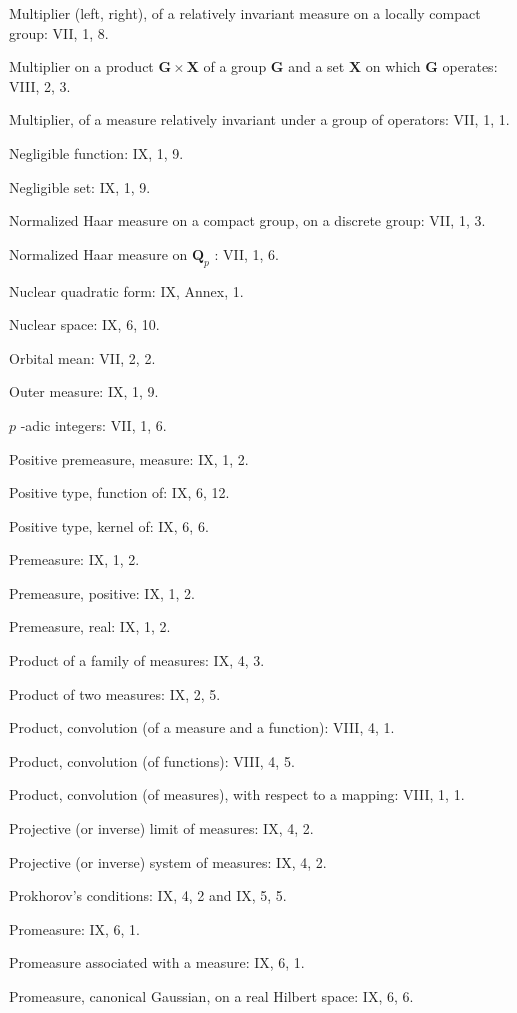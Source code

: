 Multiplier (left, right), of a relatively invariant measure on a locally compact group: VII, 1, 8.

Multiplier on a product \(\mathbf{G} \times \mathbf{X}\) of a group \(\mathbf{G}\) and a set \(\mathbf{X}\) on which \(\mathbf{G}\) operates: VIII, 2, 3.

Multiplier, of a measure relatively invariant under a group of operators: VII, 1, 1.

Negligible function: IX, 1, 9.

Negligible set: IX, 1, 9.

Normalized Haar measure on a compact group, on a discrete group: VII, 1, 3.

Normalized Haar measure on \(\mathbf{Q}_p\) : VII, 1, 6.

Nuclear quadratic form: IX, Annex, 1.

Nuclear space: IX, 6, 10.

Orbital mean: VII, 2, 2.

Outer measure: IX, 1, 9.

\(p\) -adic integers: VII, 1, 6.

Positive premeasure, measure: IX, 1, 2.

Positive type, function of: IX, 6, 12.

Positive type, kernel of: IX, 6, 6.

Premeasure: IX, 1, 2.

Premeasure, positive: IX, 1, 2.

Premeasure, real: IX, 1, 2.

Product of a family of measures: IX, 4, 3.

Product of two measures: IX, 2, 5.

Product, convolution (of a measure and a function): VIII, 4, 1.

Product, convolution (of functions): VIII, 4, 5.

Product, convolution (of measures), with respect to a mapping: VIII, 1, 1.

Projective (or inverse) limit of measures: IX, 4, 2.

Projective (or inverse) system of measures: IX, 4, 2.

Prokhorov's conditions: IX, 4, 2 and IX, 5, 5.

Promeasure: IX, 6, 1.

Promeasure associated with a measure: IX, 6, 1.

Promeasure, canonical Gaussian, on a real Hilbert space: IX, 6, 6.

